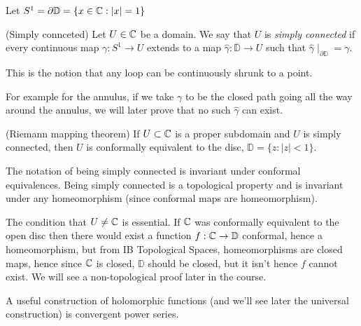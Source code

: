 \documentclass{article}
\begin{document}
\par
Let $ S^1 =\partial \mathbb D = \{x\in \mathbb{C}: |x|=1\} $
\begin{definition}
	(Simply connceted) Let $ U\in \mathbb{C} $ be a domain. We say that $ U $ is \textit{simply connected} if every continuous map $ \gamma: S^1 \to U $ extends to a map  $ \hat\gamma:\overline{\mathbb{D}}\to U $ such that $ \hat\gamma\mid_{\partial \mathbb{D}} = \gamma $.
\end{definition}
\begin{remark}
  This is the notion that any loop can be continuously shrunk to a point.
\end{remark}
For example for the annulus, if we take $ \gamma $ to be the closed path going all the way around the annulus, we will later prove that no such $ \hat\gamma $ can exist.
\begin{theorem}
	(Riemann mapping theorem) If $ U\subset \mathbb{C} $ is a proper subdomain and $ U $ is simply connected, then $ U $ is conformally equivalent to the disc, $ \mathbb D = \{z:|z|<1\} $.
\end{theorem}
\begin{remark}
  The notation of being simply connected is invariant under conformal equivalences. Being simply connected is a topological property and is invariant under any homeomorphism (since conformal maps are homeomorphism).
\end{remark}
\begin{remark}
  The condition that $ U\ne \mathbb{C} $ is essential. If $ \mathbb{C} $ was conformally equivalent to the open disc then there would exist a function $ f: \mathbb{C}\to \mathbb D $ conformal, hence a homeomorphism, but from IB Topological Spaces, homeomorphisms are closed maps, hence since $ \mathbb{C} $ is closed, $ \mathbb D $ should be closed, but it isn't hence $ f $ cannot exist. We will see a non-topological proof later in the course.
\end{remark}
A useful construction of holomorphic functions (and we'll see later the universal construction) is convergent power series.
\end{document}
